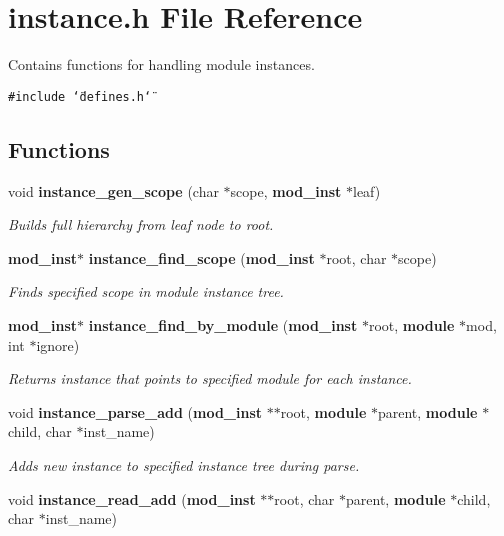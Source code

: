 \section{instance.h File Reference}
\label{instance_8h}
Contains functions for handling module instances. 


{\tt \#include \char`\"{}defines.h\char`\"{}}\par
\subsection*{Functions}
\begin{CompactItemize}
\item 
void {\bf instance\_\-gen\_\-scope} (char $\ast$scope, {\bf mod\_\-inst} $\ast$leaf)
\begin{CompactList}\small\item\em Builds full hierarchy from leaf node to root.\item\end{CompactList}\item 
{\bf mod\_\-inst}$\ast$ {\bf instance\_\-find\_\-scope} ({\bf mod\_\-inst} $\ast$root, char $\ast$scope)
\begin{CompactList}\small\item\em Finds specified scope in module instance tree.\item\end{CompactList}\item 
{\bf mod\_\-inst}$\ast$ {\bf instance\_\-find\_\-by\_\-module} ({\bf mod\_\-inst} $\ast$root, {\bf module} $\ast$mod, int $\ast$ignore)
\begin{CompactList}\small\item\em Returns instance that points to specified module for each instance.\item\end{CompactList}\item 
void {\bf instance\_\-parse\_\-add} ({\bf mod\_\-inst} $\ast$$\ast$root, {\bf module} $\ast$parent, {\bf module} $\ast$child, char $\ast$inst\_\-name)
\begin{CompactList}\small\item\em Adds new instance to specified instance tree during parse.\item\end{CompactList}\item 
void {\bf instance\_\-read\_\-add} ({\bf mod\_\-inst} $\ast$$\ast$root, char $\ast$parent, {\bf module} $\ast$child, char $\ast$inst\_\-name)

\end{CompactItemize}
